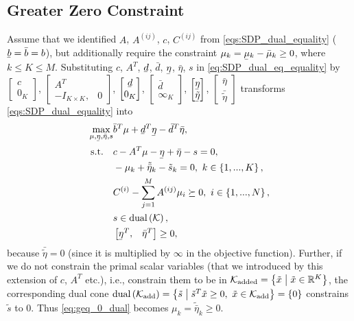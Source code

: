 \documentclass{article}
\newcommand{\f}[2]{#1\left(#2\right)}
\newcommand{\setdef}[2][]{
	\left\{
	\ifblank{#1}{}{#1 \hspace{.1cm} \middle| \hspace{.1cm}}
	#2
	\right\}
}
\newcommand{\var}[2]{{#1}_{\mathrm{#2}}}
\newcommand{\set}[1]{\mathcal{#1}}
\newcommand{\ubar}[1]{\underaccent{\bar}{#1}}
\begin{document}
		\subsection{Greater Zero Constraint}
		Assume that we identified $A$, $A^{(ij)}$, $c$, $C^{(ij)}$ from \cref{eqs:SDP_dual_equality} ($\ubar{b}=\bar{b}=b$), but additionally require the constraint $\mu_k = \ubar{\mu}_k-\bar{\mu}_k \geq 0$, where $k\leq K\leq M$. Substituting $c$, $A^T$, $\ubar{d}$, $\bar{d}$, $\ubar{\eta}$, $\bar{\eta}$, $s$ in \cref{eq:SDP_dual_eq_equality} by $\begin{bmatrix}c\\0_K\end{bmatrix}$, $\begin{bmatrix}A^T\\-I_{K\times K},&0\end{bmatrix}$, $\begin{bmatrix}\ubar{d}\\0_K\end{bmatrix}$, $ \begin{bmatrix}\bar{d}\\\infty_K\end{bmatrix}$, $\begin{bmatrix}\ubar{\eta}\\\ubar{\tilde{\eta}}\end{bmatrix}$, $\begin{bmatrix}\bar{\eta}\\\bar{\tilde{\eta}}\end{bmatrix}$ transforms \cref{eqs:SDP_dual_equality} into
		\begin{subequations}
			\begin{align}
				\max_{\mu,\ubar{\eta},\bar{\eta},s} &\bar{b}^T\mu +\ubar{d}^T\ubar{\eta}-\bar{d}^T\bar{\eta},\\
				\text{s.t.} \quad 	&c - A^T\mu -\ubar{\eta}+\bar{\eta} - s=0,\\
									&-\mu_k+\tilde{\bar{\eta}}_k -\tilde{s}_k = 0, \ k\in\setdef{1,...,K},\label{eq:geq_0_dual}\\
				&C^{(i)}-\sum_{j=1}^{M}A^{(ij)}\mu_i \succeq 0, \ i\in\setdef{1,...,N},\\
				&s\in\f{\text{dual}}{\set{K}},\\
				&\begin{bmatrix}\ubar{\eta}^T,&\bar{\eta}^T\end{bmatrix}\geq 0,
			\end{align}
		\end{subequations} 
		because $\bar{\tilde{\eta}}=0$ (since it is multiplied by $\infty$ in the objective function). Further, if we do not constrain the primal scalar variables (that we introduced by this extension of $c$, $A^T$ etc.), i.e., constrain them to be in $\var{\set{K}}{added}=\setdef[\tilde{x}]{\tilde{x}\in\mathbb{R}^K}$, the corresponding dual cone $\f{\text{dual}}{\var{\set{K}}{add}} = \setdef[\tilde{s}]{\tilde{s}^T\tilde{x}\geq 0, \ \tilde{x}\in\var{\set{K}}{add}} = \setdef{0}$ constrains $\tilde{s}$ to $0$. Thus \cref{eq:geq_0_dual} becomes $\mu_k=\tilde{\bar{\eta}}_k \geq 0$.
		
\end{document}
